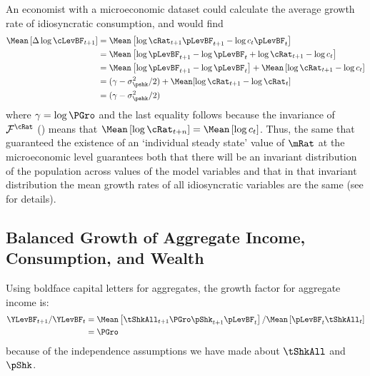 \documentclass[BufferStockTheory]{subfiles}
\begin{document}
An economist with a microeconomic dataset could calculate the average growth rate of idiosyncratic consumption, and would find
\begin{align*}
  \Mean\left[\Delta \log \cLevBF_{t+1}\right]  & = \Mean\left[ \log {\cRat}_{t+1}\pLevBF_{t+1} - \log c_{t}\pLevBF_{t}\right]  \notag \\
                                               & = \Mean\left[ \log \pLevBF_{t+1}- \log \pLevBF_{t} + \log {\cRat}_{t+1} - \log c_{t}\right]  \notag \\
                                               & = \Mean\left[ \log \pLevBF_{t+1}- \log \pLevBF_{t}\right] + \Mean\left[ \log {\cRat}_{t+1} - \log c_{t}\right]  \notag \\
                                               & = (\gamma - \sigma^{2}_{\pshk}/2) + \Mean[\log \cRat_{t+1} - \log \cRat_{t}] \\
                                               & = (\gamma - \sigma^{2}_{\pshk}/2)
\end{align*}
where $\gamma=\log \PGro$ and the last equality follows because the invariance of
 $\mathcal{F}^{\cRat}$ (\cite{szeidlInvariant}) means that $\Mean\left[ \log
  {\cRat}_{t+n}\right] = \Mean\left[ \log
  c_{t}\right]$.  Thus, the same {\GIC} that guaranteed the existence of an `individual steady state' value of $\mRat$ at the microeconomic level guarantees both that there will be an invariant distribution of the population across values of the model variables and that in that invariant distribution the mean growth rates of all idiosyncratic variables are the same (see \cite{szeidlInvariant} for details).

\hypertarget{Growth-Rates-of-Aggregate-Income-and-Consumption}{}
\subsection{Balanced Growth of Aggregate Income, Consumption, and Wealth}
\label{subsec:cGroEqPGroQ}


Using boldface capital letters for aggregates, the growth factor for aggregate income is:
\begin{align*}
  \YLevBF_{t+1}/\YLevBF_{t}  & = \Mean\left[\tShkAll_{t+1}\PGro \pShk_{t+1}\pLevBF_{t}\right]/\Mean\left[\pLevBF_{t}\tShkAll_{t}\right]  \\
                             & = \PGro
\end{align*}
because of the independence assumptions we have made about $\tShkAll$ and $\pShk$.
\end{document}
